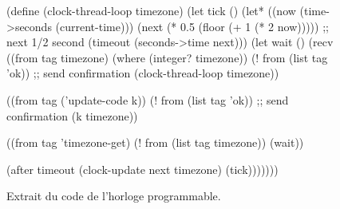 \begin{figure}[ht]
  \centering\fontsize{12}{8}
\begin{mplisting}{1}
(define (clock-thread-loop timezone)
  (let tick ()
    (let* ((now (time->seconds (current-time)))
           (next (* 0.5 (floor (+ 1 (* 2 now))))) ;; next 1/2 second
           (timeout (seconds->time next)))
      (let wait ()
        (recv
          ((from tag timezone) (where (integer? timezone))
           (! from (list tag 'ok)) ;; send confirmation
           (clock-thread-loop timezone))

          ((from tag ('update-code k))
           (! from (list tag 'ok)) ;; send confirmation
           (k timezone))

          ((from tag 'timezone-get)
           (! from (list tag timezone))
           (wait))

          (after timeout
           (clock-update next timezone)
           (tick)))))))
\end{mplisting}
  \caption{Extrait du code de l'horloge programmable.}
  \label{fig:termite-clock@v1}
  \vspace*{4ex}
\end{figure}

